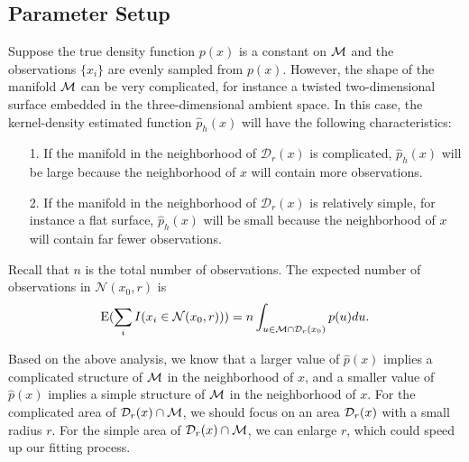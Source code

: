 \documentclass[aos,preprint]{imsart}
\theoremstyle{remark}
\begin{document}
\subsection{Parameter Setup}
Suppose the true density function $p(x)$ is a constant on $\cal M$ and the observations $\{x_i\}$ are evenly sampled from $p(x)$. However, the shape of the manifold $\cal M$ can be very complicated, for instance a twisted two-dimensional surface embedded in the three-dimensional ambient space. In this case, the kernel-density estimated function $\hat{p}_h(x)$ will have the following characteristics:
\begin{itemize}
\item[1.] If the manifold in the neighborhood of ${\mathcal D}_r(x)$ is complicated, $\hat{p}_h(x)$ will be large because the neighborhood of $x$ will contain more observations.
\item[2.] If the manifold in the neighborhood of ${\mathcal D}_r(x)$ is relatively simple, for instance a flat surface, $\hat{p}_h(x)$ will be small because the neighborhood of $x$ will contain far fewer observations.
\end{itemize}
Recall that $n$ is the total number of observations. The expected number of observations in ${\mathcal N}(x_0 ,r)$ is 
\[
{\rm E}(\sum_i I(x_i\in {\mathcal N}(x_0 ,r)))=n \int_{u\in {\cal M}\cap{\mathcal D}_r(x_0) } p(u) du.
\]

Based on the above analysis, we know that a larger value of $\hat{p}(x)$ implies a complicated structure of $\cal M$ in the neighborhood of $x$, and a smaller value of $\hat{p}(x)$ implies a simple structure of $\cal M$ in the neighborhood of $x$.
For the complicated area of ${\cal D}_r(x) \cap\cal M$, we should focus on an area ${\cal D}_r(x)$ with a small radius $r$. For the simple area of ${\cal D}_r(x) \cap\cal M$, we can enlarge $r$, which could speed up our fitting process.
%
%
\end{document}
